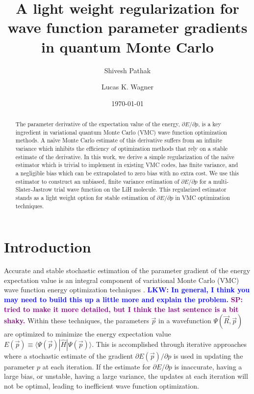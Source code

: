 \documentclass[twocolumn]{revtex4-1}
\newcommand{\lucas}[1]{\textbf{\textcolor{blue}{LKW: #1}}}
\newcommand{\shivesh}[1]{\textbf{\textcolor{purple}{SP: #1}}}
\begin{document}
\title{A light weight regularization for wave function parameter gradients
\\ in quantum Monte Carlo}

\author{Shivesh Pathak}

\author{Lucas K. Wagner}

\date{\today}
\begin{abstract}
The parameter derivative of the expectation value of the energy, $\partial E/\partial p$, is a key ingredient in variational quantum Monte Carlo (VMC) wave function optimization methods.
A na\"ive Monte Carlo estimate of this derivative suffers from an infinite variance which inhibits the efficiency of optimization methods that rely on a stable estimate of the derivative.
In this work, we derive a simple regularization of the na\"ive estimator which is trivial to implement in existing VMC codes, has finite variance, and a negligible bias which can be extrapolated to zero bias with no extra cost.
We use this estimator to construct an unbiased, finite variance estimation of $\partial E/\partial p$ for a multi-Slater-Jastrow trial wave function on the LiH molecule.
This regularized estimator stands as a light weight option for stable estimation of $\partial E/\partial p$ in VMC optimization techniques.
\end{abstract}
\maketitle 

\section{Introduction}
Accurate and stable stochastic estimation of the parameter gradient of the energy expectation value is an integral component of variational Monte Carlo (VMC) wave function energy optimization techniques \cite{PhysRevB.64.024512, doi:10.1063/1.1604379, Toulouse2007, Umrigar2005, Umrigar2007, Toulouse2008}.
\lucas{In general, I think you may need to build this up a little more and explain the problem.} \shivesh{tried to make it more detailed, but I think the last sentence is a bit shaky.} 
Within these techniques, the parameters $\vec{p}$ in a wavefunction $\Psi(\vec{R},\vec{p})$ are optimized to minimize the energy expectation value $E(\vec{p}) \equiv \langle \Psi(\vec{p})|\hat{H} |\Psi(\vec{p})\rangle$.
This is accomplished through iterative approaches where a stochastic estimate of the gradient $\partial E(\vec{p})/\partial p$ is used in updating the parameter $p$ at each iteration. 
If the estimate for $\partial E/\partial p$ is inaccurate, having a large bias, or unstable, having a large variance, the updates at each iteration will not be optimal, leading to inefficient wave function optimization.
\end{document}

